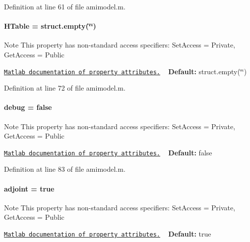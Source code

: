 Definition at line 61 of file amimodel.\+m.

\hypertarget{classamimodel_aafe6335df413dd688a2f44efba012cf1}{}
\paragraph[{H\+Table}]{\setlength{\rightskip}{0pt plus 5cm}H\+Table = struct.\+empty(\char`\"{}\char`\"{})}\label{classamimodel_aafe6335df413dd688a2f44efba012cf1}
\begin{DoxyNote}{Note}
This property has non-\/standard access specifiers\+: {\ttfamily Set\+Access = Private, Get\+Access = Public} 

\href{http://www.mathworks.com/help/matlab/matlab_oop/property-attributes.html}{\tt Matlab documentation of property attributes.} ~\newline
{\bfseries Default\+:} struct.\+empty(\char`\"{}\char`\"{}) 
\end{DoxyNote}


Definition at line 72 of file amimodel.\+m.

\hypertarget{classamimodel_a0514aabed091ee5e2f35766eb01eced6}{}
\paragraph[{debug}]{\setlength{\rightskip}{0pt plus 5cm}debug = false}\label{classamimodel_a0514aabed091ee5e2f35766eb01eced6}
\begin{DoxyNote}{Note}
This property has non-\/standard access specifiers\+: {\ttfamily Set\+Access = Private, Get\+Access = Public} 

\href{http://www.mathworks.com/help/matlab/matlab_oop/property-attributes.html}{\tt Matlab documentation of property attributes.} ~\newline
{\bfseries Default\+:} false 
\end{DoxyNote}


Definition at line 83 of file amimodel.\+m.

\hypertarget{classamimodel_ab6d500b41cf50693452415caca31d32e}{}
\paragraph[{adjoint}]{\setlength{\rightskip}{0pt plus 5cm}adjoint = true}\label{classamimodel_ab6d500b41cf50693452415caca31d32e}
\begin{DoxyNote}{Note}
This property has non-\/standard access specifiers\+: {\ttfamily Set\+Access = Private, Get\+Access = Public} 

\href{http://www.mathworks.com/help/matlab/matlab_oop/property-attributes.html}{\tt Matlab documentation of property attributes.} ~\newline
{\bfseries Default\+:} true 
\end{DoxyNote}


